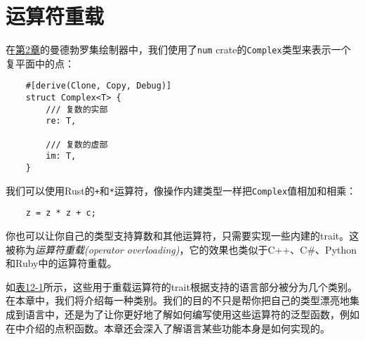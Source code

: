 \chapter{运算符重载}\label{ch12}

在\hyperref[ch02]{第2章}的曼德勃罗集绘制器中，我们使用了\texttt{num} crate的\texttt{Complex}类型来表示一个复平面中的点：
\begin{verbatim}
    #[derive(Clone, Copy, Debug)]
    struct Complex<T> {
        /// 复数的实部
        re: T,

        /// 复数的虚部
        im: T,
    }
\end{verbatim}

我们可以使用Rust的\texttt{+}和\texttt{*}运算符，像操作内建类型一样把\texttt{Complex}值相加和相乘：
\begin{verbatim}
    z = z * z + c;
\end{verbatim}

你也可以让你自己的类型支持算数和其他运算符，只需要实现一些内建的trait。这被称为\emph{运算符重载(operator overloading)}，它的效果也类似于C++、C\#、Python和Ruby中的运算符重载。

如\hyperref[t12-1]{表12-1}所示，这些用于重载运算符的trait根据支持的语言部分被分为几个类别。在本章中，我们将介绍每一种类别。我们的目的不只是帮你把自己的类型漂亮地集成到语言中，还是为了让你更好地了解如何编写使用这些运算符的泛型函数，例如在中介绍的点积函数。本章还会深入了解语言某些功能本身是如何实现的。

